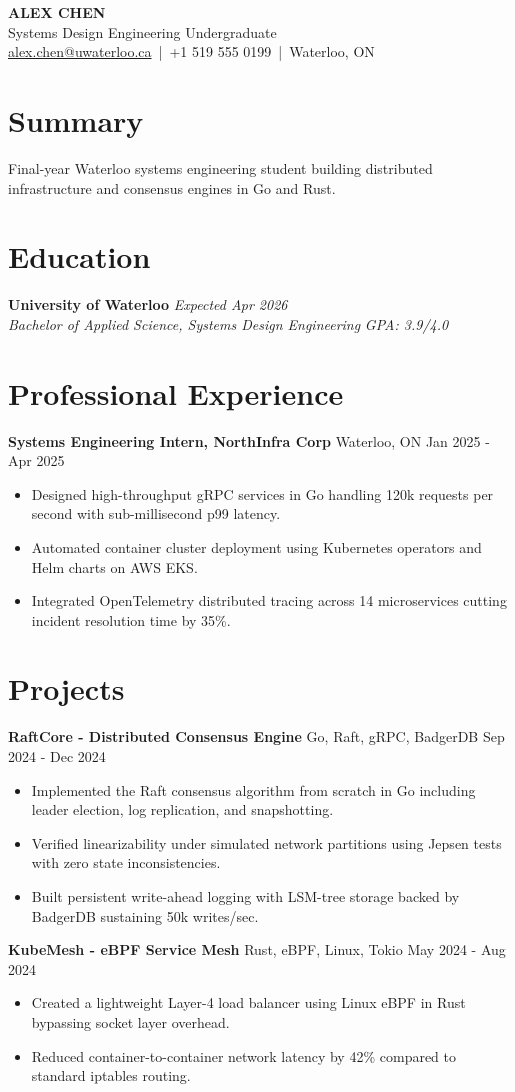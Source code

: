 \documentclass[10pt]{article}
\newcommand{\experienceitem}[4]{\textbf{#1} #2 #3 #4}
\newcommand{\projectitem}[4]{\textbf{#1} #2 #3 #4}
\begin{document}
\begin{center}
{\Large \textbf{ALEX CHEN}}\\
{\normalsize Systems Design Engineering Undergraduate}\\
\href{mailto:alex.chen@uwaterloo.ca}{alex.chen@uwaterloo.ca} \,|\, +1 519 555 0199 \,|\, Waterloo, ON
\end{center}
\section{Summary}
Final-year Waterloo systems engineering student building distributed infrastructure and consensus engines in Go and Rust.
\section{Education}
\noindent\textbf{University of Waterloo} \hfill \textit{Expected Apr 2026}\\
\textit{Bachelor of Applied Science, Systems Design Engineering} \hfill \textit{GPA: 3.9/4.0}
\section{Professional Experience}
\experienceitem{Systems Engineering Intern, NorthInfra Corp}{Waterloo, ON}{Jan 2025 - Apr 2025}{
\begin{itemize}
  \item Designed high-throughput gRPC services in Go handling 120k requests per second with sub-millisecond p99 latency.
  \item Automated container cluster deployment using Kubernetes operators and Helm charts on AWS EKS.
  \item Integrated OpenTelemetry distributed tracing across 14 microservices cutting incident resolution time by 35\%.
\end{itemize}}
\section{Projects}
\projectitem{RaftCore - Distributed Consensus Engine}{Go, Raft, gRPC, BadgerDB}{Sep 2024 - Dec 2024}{
\begin{itemize}
  \item Implemented the Raft consensus algorithm from scratch in Go including leader election, log replication, and snapshotting.
  \item Verified linearizability under simulated network partitions using Jepsen tests with zero state inconsistencies.
  \item Built persistent write-ahead logging with LSM-tree storage backed by BadgerDB sustaining 50k writes/sec.
\end{itemize}}
\projectitem{KubeMesh - eBPF Service Mesh}{Rust, eBPF, Linux, Tokio}{May 2024 - Aug 2024}{
\begin{itemize}
  \item Created a lightweight Layer-4 load balancer using Linux eBPF in Rust bypassing socket layer overhead.
  \item Reduced container-to-container network latency by 42\% compared to standard iptables routing.
\end{itemize}}
\end{document}
